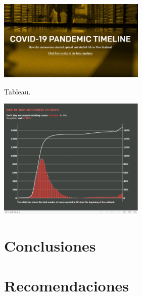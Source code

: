 \documentclass[twoside,twocolumn]{article}
\begin{document}
\includegraphics[width=7cm]{imagenes/img13.png}

Tableau. 

\includegraphics[width=7cm]{imagenes/img14.png}

\section{Conclusiones}



\section{Recomendaciones}

\end{document}
